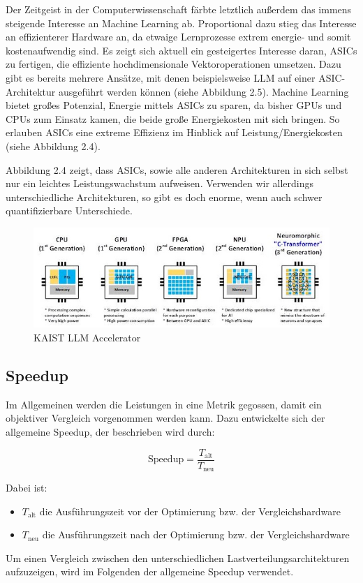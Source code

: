 Der Zeitgeist in der Computerwissenschaft färbte letztlich außerdem das immens steigende Interesse an Machine Learning ab. Proportional dazu stieg das Interesse an effizienterer Hardware an, da etwaige Lernprozesse extrem energie- und somit kostenaufwendig sind. Es zeigt sich aktuell ein gesteigertes Interesse daran, ASICs zu fertigen, die effiziente hochdimensionale Vektoroperationen umsetzen. Dazu gibt es bereits mehrere Ansätze, mit denen beispielsweise LLM auf einer ASIC-Architektur ausgeführt werden können (siehe Abbildung 2.5). Machine Learning bietet großes Potenzial, Energie mittels ASICs zu sparen, da bisher GPUs und CPUs zum Einsatz kamen, die beide große Energiekosten mit sich bringen. So erlauben ASICs eine extreme Effizienz im Hinblick auf Leistung/Energiekosten (siehe Abbildung 2.4).

Abbildung 2.4 zeigt, dass ASICs, sowie alle anderen Architekturen in sich selbst nur ein leichtes Leistungswachstum aufweisen. Verwenden wir allerdings unterschiedliche Architekturen, so gibt es doch enorme, wenn auch schwer quantifizierbare Unterschiede.
\begin{figure}
    \centering
    \includegraphics[width=0.8\linewidth]{images/lowpowerasic.png}
    \caption{KAIST LLM Accelerator \cite{kaist}}
    \label{fig:enter-label}
\end{figure}
\subsection{Speedup}
Im Allgemeinen werden die Leistungen in eine Metrik gegossen, damit ein objektiver Vergleich vorgenommen werden kann. Dazu entwickelte sich der allgemeine Speedup, der beschrieben wird durch: \cite{speedup}

\begin{equation}
\text{Speedup} = \frac{T_{\text{alt}}}{T_{\text{neu}}}
\end{equation}

Dabei ist:
\begin{itemize}
  \item $T_{\text{alt}}$ die Ausführungszeit vor der Optimierung bzw. der Vergleichshardware
  \item $T_{\text{neu}}$ die Ausführungszeit nach der Optimierung bzw. der Vergleichshardware
\end{itemize}
Um einen Vergleich zwischen den unterschiedlichen Lastverteilungsarchitekturen aufzuzeigen, wird im Folgenden der allgemeine Speedup verwendet.